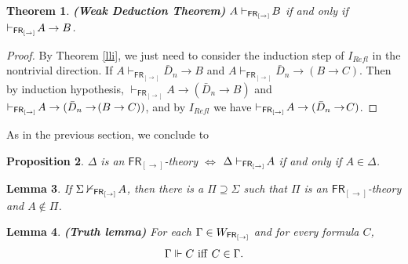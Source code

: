 \documentclass[12pt]{article}
\newtheorem{thm}{Theorem}[section]
\newtheorem{prop}[thm]{Proposition}
\newtheorem{lem}[thm]{Lemma}
\newtheorem{dfn}[thm]{Definition}
\begin{document}


\begin{thm}
\em\textbf{(Weak Deduction Theorem)} $A\vdash_{{\sf FR_{[\rightarrow]}} }\!B  $ if and only if $\vdash_{{\sf FR_{[\rightarrow]}} }\! A\rightarrow B $.
\end{thm}
\begin{proof} By Theorem \ref{lli}, we just need to consider the induction step of $ I_{Refl} $ in the nontrivial direction.
If $ A\vdash_\mathsf{ FR_{[\rightarrow]}}\!\bar{D}_n\rightarrow \!B $
and $  A\vdash_\mathsf{ FR_{[\rightarrow]}}\!\bar{D}_n\rightarrow\!(B\rightarrow C)  $. 
Then by induction hypothesis, $\vdash_\mathsf{ FR_{[\rightarrow]}}\!A\rightarrow (\bar{D}_n\rightarrow\!B)$
and $\vdash_{{\sf FR_{[\rightarrow]}} }\!A\rightarrow (\bar{D}_n\rightarrow\!(B\rightarrow C)) $, and by $ I_{Refl} $ we have $\vdash_{{\sf FR_{[\rightarrow]}} }\!A\rightarrow (\bar{D}_n\rightarrow\!
C)$.  
\end{proof}

As in the previous section, we conclude to

\begin{prop}
$ \Delta $ is an $\mathsf{FR_{[\rightarrow]}}$-theory $ \Longleftrightarrow $ $ \Delta\vdash_{{\sf FR_{[\rightarrow]}} }\!A $ if and only if $ A \in \Delta$.
\end{prop}

\begin{lem}
\label{g11}
 If $ \Sigma\nvdash_{{\sf FR_{[\rightarrow]}} }\!A$, then there is a $ \Pi\supseteq \Sigma $  such that $ \Pi $ is an $\mathsf{FR}_{[\rightarrow]} $-theory and  $ A \notin \Pi $.
\end{lem}


\begin{lem}\label{D}
\em\textbf{(Truth lemma)} For each $ \Gamma \in  W_{{\sf FR_{[\rightarrow]}}}$ and for every formula $  C $, $$ \Gamma\Vdash   C~{\rm iff}~ C \in \Gamma .$$
\end{lem}
\end{document}
